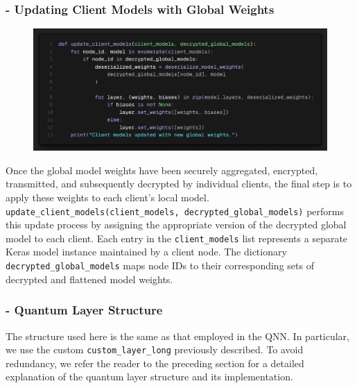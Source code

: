 \documentclass[10pt]{article}
\begin{document}
\subsubsection*{- Updating Client Models with Global Weights}
\begin{figure}[H]
	\centering
	\includegraphics[height = 0.2\textheight]{img/QFL_code/5.png}
\end{figure}
Once the global model weights have been securely aggregated, encrypted, transmitted, and subsequently decrypted by individual clients, the final step is to apply these weights to each client's local model.\\
\texttt{update\_client\_models(client\_models, decrypted\_global\_models)} performs this update process by assigning the appropriate version of the decrypted global model to each client.
Each entry in the \texttt{client\_models} list represents a separate Keras model instance maintained by a client node. The dictionary \texttt{decrypted\_global\_models} maps node IDs to their corresponding sets of decrypted and flattened model weights.


\subsubsection*{- Quantum Layer Structure}
The structure used here is the same as that employed in the QNN. In particular, we use the custom \texttt{custom\_layer\_long} previously described. To avoid redundancy, we refer the reader to the preceding section for a detailed explanation of the quantum layer structure and its implementation.
\end{document}
